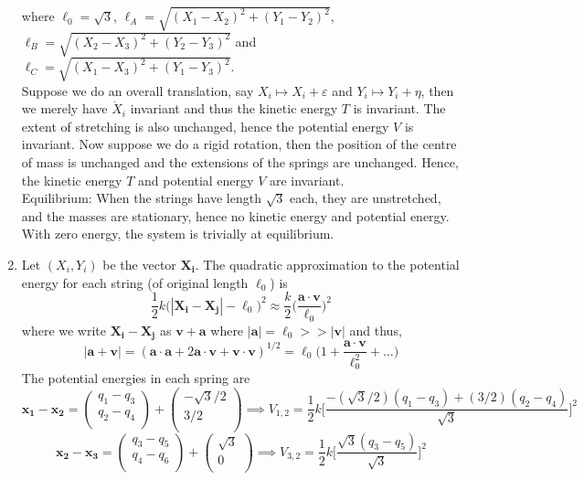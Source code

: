 \documentclass[a4paper]{article}
\begin{document}
\begin{ans}
\begin{enumerate}[label=(\roman*)]
where $\ell_0=\sqrt{3}$, $\ell_A=\sqrt{(X_1-X_2)^2+(Y_1-Y_2)^2}$, $\ell_B=\sqrt{(X_2-X_3)^2+(Y_2-Y_3)^2}$ and $\ell_C=\sqrt{(X_1-X_3)^2+(Y_1-Y_3)^2}$.\\[5pt]
Suppose we do an overall translation, say $X_i\mapsto X_i+\varepsilon$ and $Y_i\mapsto Y_i+\eta$, then we merely have $\dot{X}_i$ invariant and thus the kinetic energy $T$ is invariant. The extent of stretching is also unchanged, hence the potential energy $V$ is invariant. Now suppose we do a rigid rotation, then the position of the centre of mass is unchanged and the extensions of the springs are unchanged. Hence, the kinetic energy $T$ and potential energy $V$ are invariant.\\[5pt]
Equilibrium: When the strings have length $\sqrt{3}$ each, they are unstretched, and the masses are stationary, hence no kinetic energy and potential energy. With zero energy, the system is trivially at equilibrium.
\item Let $(X_i,Y_i)$ be the vector $\mathbf{X_i}$. The quadratic approximation to the potential energy for each string (of original length $\ell_0$) is
$$\frac{1}{2}k\bigg(|\mathbf{X_i}-\mathbf{X_j}|-\ell_0\bigg)^2\approx\frac{k}{2}\bigg(\frac{\mathbf{a}\cdot\mathbf{v}}{\ell_0}\bigg)^2$$
where we write $\mathbf{X_i}-\mathbf{X_j}$ as $\mathbf{v}+\mathbf{a}$ where $|\mathbf{a}|=\ell_0>>|\mathbf{v}|$ and thus, 
$$|\mathbf{a}+\mathbf{v}|=(\mathbf{a}\cdot\mathbf{a}+2\mathbf{a}\cdot\mathbf{v}+\mathbf{v}\cdot\mathbf{v})^{1/2}=\ell_0\bigg(1+\frac{\mathbf{a}\cdot\mathbf{v}}{\ell_0^2}+\dots\bigg)$$
The potential energies in each spring are
$$\mathbf{x_1}-\mathbf{x_2}=\begin{pmatrix}q_1-q_3\\q_2-q_4\\\end{pmatrix}+\begin{pmatrix}-\sqrt{3}/2\\3/2\\\end{pmatrix}\implies V_{1,2}=\frac{1}{2}k\bigg[\frac{-(\sqrt{3}/2)(q_1-q_3)+(3/2)(q_2-q_4)}{\sqrt{3}}\bigg]^2$$
$$\mathbf{x_2}-\mathbf{x_3}=\begin{pmatrix}q_3-q_5\\q_4-q_6\\\end{pmatrix}+\begin{pmatrix}\sqrt{3}\\0\\\end{pmatrix}\implies V_{3,2}=\frac{1}{2}k\bigg[\frac{\sqrt{3}(q_3-q_5)}{\sqrt{3}}\bigg]^2$$

\end{enumerate}
\end{ans}
\end{document}
